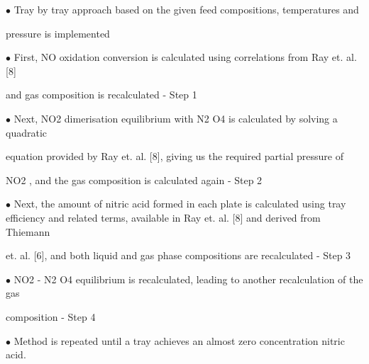 \documentclass[a4paper,portrait,12pt]{article}
\begin{document}
\begin{flushleft}
$\bullet$ Tray by tray approach based on the given feed compositions, temperatures and
\end{flushleft}


\begin{flushleft}
pressure is implemented
\end{flushleft}


\begin{flushleft}
$\bullet$ First, NO oxidation conversion is calculated using correlations from Ray et. al. [8]
\end{flushleft}


\begin{flushleft}
and gas composition is recalculated - Step 1
\end{flushleft}


\begin{flushleft}
$\bullet$ Next, NO2 dimerisation equilibrium with N2 O4 is calculated by solving a quadratic
\end{flushleft}


\begin{flushleft}
equation provided by Ray et. al. [8], giving us the required partial pressure of
\end{flushleft}


\begin{flushleft}
NO2 , and the gas composition is calculated again - Step 2
\end{flushleft}


\begin{flushleft}
$\bullet$ Next, the amount of nitric acid formed in each plate is calculated using tray efficiency and related terms, available in Ray et. al. [8] and derived from Thiemann
\end{flushleft}


\begin{flushleft}
et. al. [6], and both liquid and gas phase compositions are recalculated - Step 3
\end{flushleft}


\begin{flushleft}
$\bullet$ NO2 - N2 O4 equilibrium is recalculated, leading to another recalculation of the gas
\end{flushleft}


\begin{flushleft}
composition - Step 4
\end{flushleft}


\begin{flushleft}
$\bullet$ Method is repeated until a tray achieves an almost zero concentration nitric acid.
\end{flushleft}
\end{document}
